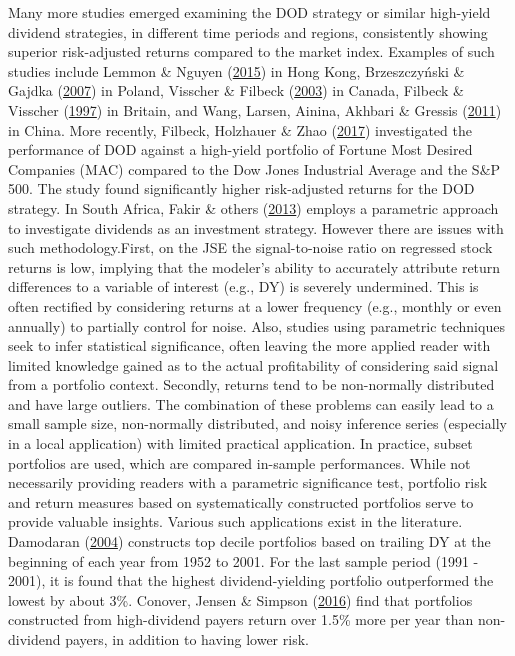 \documentclass[11pt,preprint, authoryear]{elsarticle}
\numberwithin{equation}{section}
\numberwithin{figure}{section}
\numberwithin{table}{section}
\begin{document}
Many more studies emerged examining the DOD strategy or similar
high-yield dividend strategies, in different time periods and regions,
consistently showing superior risk-adjusted returns compared to the
market index. Examples of such studies include Lemmon \& Nguyen
(\protect\hyperlink{ref-lemmon2015dividend}{2015}) in Hong Kong,
Brzeszczyński \& Gajdka
(\protect\hyperlink{ref-brzeszczynski2007dividend}{2007}) in Poland,
Visscher \& Filbeck (\protect\hyperlink{ref-visscher2003dividend}{2003})
in Canada, Filbeck \& Visscher
(\protect\hyperlink{ref-filbeck1997}{1997}) in Britain, and Wang,
Larsen, Ainina, Akhbari \& Gressis
(\protect\hyperlink{ref-wang2011dogs}{2011}) in China. More recently,
Filbeck, Holzhauer \& Zhao
(\protect\hyperlink{ref-filbeck2017dividend}{2017}) investigated the
performance of DOD against a high-yield portfolio of Fortune Most
Desired Companies (MAC) compared to the Dow Jones Industrial Average and
the S\&P 500. The study found significantly higher risk-adjusted returns
for the DOD strategy. In South Africa, Fakir \& others
(\protect\hyperlink{ref-fakir2013dividend}{2013}) employs a parametric
approach to investigate dividends as an investment strategy. However
there are issues with such methodology.First, on the JSE the
signal-to-noise ratio on regressed stock returns is low, implying that
the modeler's ability to accurately attribute return differences to a
variable of interest (e.g., DY) is severely undermined. This is often
rectified by considering returns at a lower frequency (e.g., monthly or
even annually) to partially control for noise. Also, studies using
parametric techniques seek to infer statistical significance, often
leaving the more applied reader with limited knowledge gained as to the
actual profitability of considering said signal from a portfolio
context. Secondly, returns tend to be non-normally distributed and have
large outliers. The combination of these problems can easily lead to a
small sample size, non-normally distributed, and noisy inference series
(especially in a local application) with limited practical application.
In practice, subset portfolios are used, which are compared in-sample
performances. While not necessarily providing readers with a parametric
significance test, portfolio risk and return measures based on
systematically constructed portfolios serve to provide valuable
insights. Various such applications exist in the literature. Damodaran
(\protect\hyperlink{ref-damodaran2004investment}{2004}) constructs top
decile portfolios based on trailing DY at the beginning of each year
from 1952 to 2001. For the last sample period (1991 - 2001), it is found
that the highest dividend-yielding portfolio outperformed the lowest by
about 3\%. Conover, Jensen \& Simpson
(\protect\hyperlink{ref-conover2016difference}{2016}) find that
portfolios constructed from high-dividend payers return over 1.5\% more
per year than non-dividend payers, in addition to having lower risk.
\end{document}
